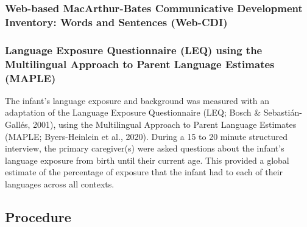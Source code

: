 \documentclass[
  english,
  ,man,floatsintext]{apa6}
\begin{document}
\hypertarget{web-based-macarthur-bates-communicative-development-inventory-words-and-sentences-web-cdi}{%
\subsubsection{Web-based MacArthur-Bates Communicative Development Inventory: Words and Sentences (Web-CDI)}\label{web-based-macarthur-bates-communicative-development-inventory-words-and-sentences-web-cdi}}

\hypertarget{language-exposure-questionnaire-leq-using-the-multilingual-approach-to-parent-language-estimates-maple}{%
\subsubsection{Language Exposure Questionnaire (LEQ) using the Multilingual Approach to Parent Language Estimates (MAPLE)}\label{language-exposure-questionnaire-leq-using-the-multilingual-approach-to-parent-language-estimates-maple}}

The infant's language exposure and background was measured with an adaptation of the Language Exposure Questionnaire (LEQ; Bosch \& Sebastián-Gallés, 2001), using the Multilingual Approach to Parent Language Estimates (MAPLE; Byers-Heinlein et al., 2020). During a 15 to 20 minute structured interview, the primary caregiver(s) were asked questions about the infant's language exposure from birth until their current age. This provided a global estimate of the percentage of exposure that the infant had to each of their languages across all contexts.

\hypertarget{procedure}{%
\subsection{Procedure}\label{procedure}}
\end{document}
